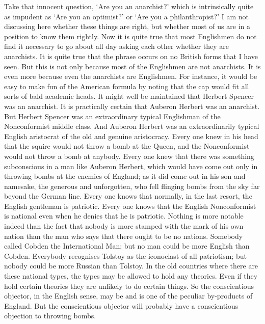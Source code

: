 \documentclass{book}
\begin{document}
Take that innocent question, ‘Are you an anarchist?’ which is intrinsically quite as impudent as ‘Are you an optimist?’ or ‘Are you a philanthropist?’ I am not discussing here whether these things are right, but whether most of us are in a position to know them rightly. Now it is quite true that most Englishmen do not find it necessary to go about all day asking each other whether they are anarchists. It is quite true that the phrase occurs on no British forms that I have seen. But this is not only because most of the Englishmen are not anarchists. It is even more because even the anarchists are Englishmen. For instance, it would be easy to make fun of the American formula by noting that the cap would fit all sorts of bald academic heads. It might well be maintained that Herbert Spencer was an anarchist. It is practically certain that Auberon Herbert was an anarchist. But Herbert Spencer was an extraordinary typical Englishman of the Nonconformist middle class. And Auberon Herbert was an extraordinarily typical English aristocrat of the old and genuine aristocracy. Every one knew in his head that the squire would not throw a bomb at the Queen, and the Nonconformist would not throw a bomb at anybody. Every one knew that there was something subconscious in a man like Auberon Herbert, which would have come out only in throwing bombs at the enemies of England; as it did come out in his son and namesake, the generous and unforgotten, who fell flinging bombs from the sky far beyond the German line. Every one knows that normally, in the last resort, the English gentleman is patriotic. Every one knows that the English Nonconformist is national even when he denies that he is patriotic. Nothing is more notable indeed than the fact that nobody is more stamped with the mark of his own nation than the man who says that there ought to be no nations. Somebody called Cobden the International Man; but no man could be more English than Cobden. Everybody recognises Tolstoy as the iconoclast of all patriotism; but nobody could be more Russian than Tolstoy. In the old countries where there are these national types, the types may be allowed to hold any theories. Even if they hold certain theories they are unlikely to do certain things. So the conscientious objector, in the English sense, may be and is one of the peculiar by-products of England. But the conscientious objector will probably have a conscientious objection to throwing bombs.
\end{document}
